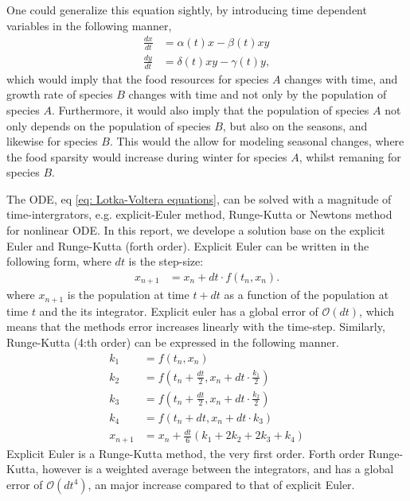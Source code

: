 \documentclass[a4paper]{article}
\newcommand{\newparagraph}{\vspace{.5cm}\noindent}
\begin{document}
\newparagraph
One could generalize this equation sightly, by introducing time dependent variables in the following manner,
\begin{align}
    \frac{dx}{dt} &= \alpha(t) x - \beta(t) xy \nonumber\\
    \frac{dy}{dt} &= \delta(t) xy - \gamma(t) y,\nonumber
\end{align}which would imply that the food resources for species $A$ changes with time, and growth rate of species $B$ changes with time and not only by the population of species $A$. Furthermore, it would also imply that the population of species $A$ not only depends on the population of species $B$, but also on the seasons, and likewise for species $B$.
This would the allow for modeling seasonal changes, where the food sparsity would increase during winter for species $A$, whilst remaning for species $B$.

\newparagraph
The ODE, eq \eqref{eq: Lotka-Voltera equations}, can be solved with a magnitude of time-intergrators, e.g. explicit-Euler method, Runge-Kutta or Newtons method for nonlinear ODE.
In this report, we develope a solution base on the explicit Euler and Runge-Kutta (forth order).
Explicit Euler can be written in the following form, where $dt$ is the step-size:
\begin{align}
    x_{n + 1} &= x_n + dt \cdot f(t_n, x_n).\label{eq: explicit euler}
\end{align}where $x_{n + 1}$ is the population at time $t + dt$ as a function of the population at time $t$ and the its integrator. Explicit euler has a global error of $\mathcal{O}(dt)$, which means that the methods error increases linearly with the time-step.
Similarly, Runge-Kutta (4:th order) can be expressed in the following manner.
\begin{align}
    k_1 &= f(t_n, x_n)\nonumber\\
    k_2 &= f\left(t_n + \frac{dt}{2}, x_n + dt\cdot\frac{k_1}{2}\right)\nonumber\\
    k_3 &= f\left(t_n + \frac{dt}{2}, x_n + dt\cdot\frac{k_2}{2}\right)\nonumber\\
    k_4 &= f\left(t_n + dt, x_n + dt\cdot k_3\right)\nonumber\\
    x_{n+1} &= x_n + \frac{dt}{6}\left(k_1 + 2k_2 + 2k_3 + k_4\right)\label{eq: runge kutta}
\end{align}Explicit Euler is a Runge-Kutta method, the very first order. Forth order Runge-Kutta, however is a weighted average between the integrators, and has a global error of $\mathcal{O}(dt^4)$, an major increase compared to that of explicit Euler.
\end{document}
